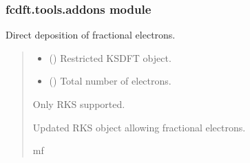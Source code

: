 \documentclass[letterpaper,10pt,english]{sphinxmanual}
\begin{document}
\subsubsection{fcdft.tools.addons module}
\label{\detokenize{fcdft.tools:module-fcdft.tools.addons}}\label{\detokenize{fcdft.tools:fcdft-tools-addons-module}}

\begin{fulllineitems}
\label{\detokenize{fcdft.tools:fcdft.tools.addons.frac_occ}}
\pysigstartsignatures
\pysiglinewithargsret
{}
{\sphinxparamcomma {}}
{}
\pysigstopsignatures
\sphinxAtStartPar
Direct deposition of fractional electrons.
\begin{quote}\begin{description}
\begin{itemize}
\item {} 
\sphinxAtStartPar
{} () \textendash{} Restricted KS\sphinxhyphen{}DFT object.

\item {} 
\sphinxAtStartPar
{} () \textendash{} Total number of electrons.

\end{itemize}

\sphinxAtStartPar
{} \textendash{} Only RKS supported.

\sphinxAtStartPar
Updated RKS object allowing fractional electrons.

\sphinxAtStartPar
mf

\end{description}\end{quote}

\end{fulllineitems}

\end{document}
